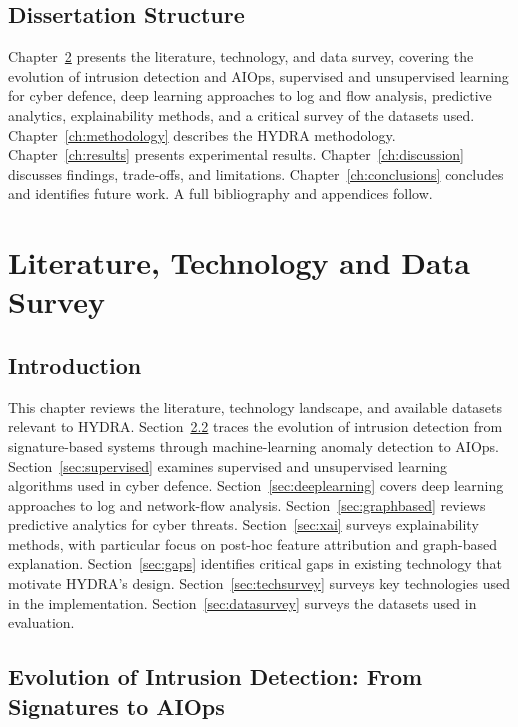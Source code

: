\documentclass[12pt,a4paper]{report}
\begin{document}
\section{Dissertation Structure}
\label{sec:structure}

Chapter~\ref{ch:literature} presents the literature, technology, and data survey, covering the evolution of intrusion detection and AIOps, supervised and unsupervised learning for cyber defence, deep learning approaches to log and flow analysis, predictive analytics, explainability methods, and a critical survey of the datasets used. Chapter~\ref{ch:methodology} describes the HYDRA methodology. Chapter~\ref{ch:results} presents experimental results. Chapter~\ref{ch:discussion} discusses findings, trade-offs, and limitations. Chapter~\ref{ch:conclusions} concludes and identifies future work. A full bibliography and appendices follow.

\chapter{Literature, Technology and Data Survey}
\label{ch:literature}

\section{Introduction}
\label{sec:lit-intro}

This chapter reviews the literature, technology landscape, and available datasets relevant to HYDRA. Section~\ref{sec:evolution} traces the evolution of intrusion detection from signature-based systems through machine-learning anomaly detection to AIOps. Section~\ref{sec:supervised} examines supervised and unsupervised learning algorithms used in cyber defence. Section~\ref{sec:deeplearning} covers deep learning approaches to log and network-flow analysis. Section~\ref{sec:graphbased} reviews predictive analytics for cyber threats. Section~\ref{sec:xai} surveys explainability methods, with particular focus on post-hoc feature attribution and graph-based explanation. Section~\ref{sec:gaps} identifies critical gaps in existing technology that motivate HYDRA's design. Section~\ref{sec:techsurvey} surveys key technologies used in the implementation. Section~\ref{sec:datasurvey} surveys the datasets used in evaluation.

\section{Evolution of Intrusion Detection: From Signatures to AIOps}
\label{sec:evolution}
\end{document}
